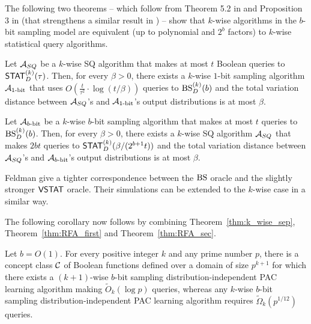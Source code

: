 The following two theorems -- which follow from Theorem 5.2 in \cite{Ben-DavidD98} and Proposition 3 in \cite{SteinhardtVW16} (that strengthens a similar result in \cite{Ben-DavidD98}) -- show that $k$-wise algorithms in the $b$-bit sampling model are equivalent (up to polynomial and $2^b$ factors) to $k$-wise statistical query algorithms.

\begin{theorem}\label{thm:RFA_first}
Let $\mathcal{A}_{SQ}$ be a $k$-wise SQ algorithm that makes at most $t$ Boolean queries to $\mathsf{STAT}^{(k)}_D(\tau)$. Then, for every $\beta>0$, there exists a $k$-wise $1$-bit sampling algorithm $\mathcal{A}_{1\text{-bit}}$ that uses $O(\frac{t}{\tau^2} \cdot \log(t/\beta))$ queries to  $\mbox{BS}^{(k)}_D(b)$ and the total variation distance between $\mathcal{A}_{SQ}$'s and $\mathcal{A}_{1\text{-bit}}$'s output distributions is at most $\beta$.
\end{theorem}

\begin{theorem}\label{thm:RFA_sec}
Let $\mathcal{A}_{b \text{-bit}}$ be a $k$-wise $b$-bit sampling algorithm that makes at most $t$ queries to $\mbox{BS}^{(k)}_D(b)$. Then, for every $\beta>0$, there exists a $k$-wise SQ algorithm $\mathcal{A}_{SQ}$ that makes $2bt$ queries to $\mathsf{STAT}^{(k)}_D(\beta/(2^{b+1} t))$ and the total variation distance between $\mathcal{A}_{SQ}$'s and $\mathcal{A}_{b\text{-bit}}$'s output distributions is at most $\beta$.
\end{theorem}

Feldman \etal \cite{FeldmanGRVX:12} give a tighter correspondence between the $\mbox{BS}$ oracle and the slightly stronger $\mathsf{VSTAT}$ oracle. Their simulations can be extended to the $k$-wise case in a similar way.%


The following corollary now follows by combining Theorem~\ref{thm:k_wise_sep}, Theorem~\ref{thm:RFA_first} and Theorem~\ref{thm:RFA_sec}.

\begin{corollary}\label{cor:RFA-separation}
Let $b = O(1)$. For every positive integer $k$ and any prime number $p$, there is a concept class $\mathcal{C}$ of Boolean functions defined over a domain of size $p^{k+1}$ for which there exists a $(k+1)$-wise $b$-bit sampling distribution-independent PAC learning algorithm making $\widetilde{O}_k(\log{p})$ queries, whereas any $k$-wise $b$-bit sampling distribution-independent PAC learning algorithm requires $\widetilde{\Omega}_k(p^{1/{12}})$ queries.
\end{corollary}

